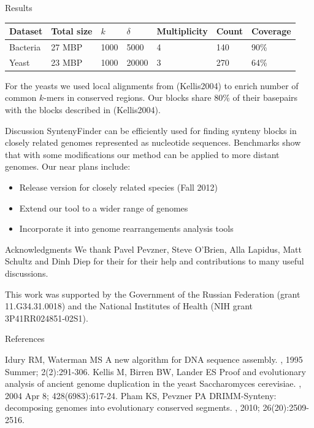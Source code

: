 \documentclass[final,hyperref={pdfpagelabels=false}]{beamer}
\begin{document}
\begin{frame}{}
\begin{columns}[t]
\begin{column}{0.32\linewidth}
\begin{block}{Results}
\begin{table}
\small
\begin{tabularx}{\textwidth}{ | X | X | X | X | X | X | X |}
	\hline
	Dataset & Total size & \(k\) & \(\delta\) & Multiplicity & Count & Coverage\\
	\hline \hline
	Bacteria & 27 MBP & 1000 & 5000 & 4 & 140 & 90\% \\
	\hline
	Yeast    &  23 MBP & 1000 & 20000 & 3 &  270 & 64\% \\
	\hline
\end{tabularx}
\end{table}

For the yeasts we used local alignments from (Kellis2004) to enrich number of common \(k\)-mers in conserved regions.
Our blocks share 80\% of their basepairs with the blocks described in (Kellis2004).
\end{block}

\begin{block}{Discussion} \justifying
SyntenyFinder can be efficiently used for finding synteny blocks in closely related genomes represented as nucleotide sequences. 
Benchmarks show that with some modifications our method can be applied to more distant genomes. Our near plans include:
\begin{itemize}
\item Release version for closely related species (Fall 2012)
\item Extend our tool to a wider range of genomes
\item Incorporate it into genome rearrangements analysis tools
\end{itemize}
\end{block}

\begin{block}{Acknowledgments} \justifying
We thank Pavel Pevzner, Steve O'Brien, Alla Lapidus, Matt Schultz and Dinh Diep for their 
for their help and contributions to many useful discussions.

This work was supported by the Government of the Russian Federation (grant 11.G34.31.0018)
and the National Institutes of Health (NIH grant 3P41RR024851-02S1).
\end{block}

\begin{block}{References} \justifying
\begin{thebibliography}{10}
\small
\beamertemplatebookbibitems
{}
Idury RM, Waterman MS
\newblock A new algorithm for DNA sequence assembly.
, 1995 Summer; 2(2):291-306.
\beamertemplatebookbibitems
{}
Kellis M, Birren BW, Lander ES
\newblock Proof and evolutionary analysis of ancient genome duplication in the yeast Saccharomyces cerevisiae.
, 2004 Apr 8; 428(6983):617-24.
\beamertemplatebookbibitems
{}
Pham KS, Pevzner PA
\newblock DRIMM-Synteny: decomposing genomes into evolutionary conserved segments.
, 2010; 26(20):2509-2516.
\end{thebibliography}
\end{block}


\end{column}
\end{columns}
\end{frame}
\end{document}
